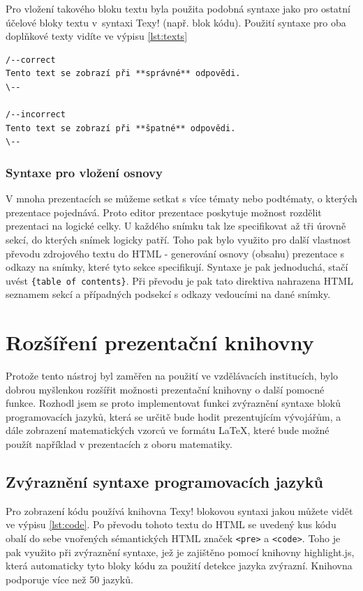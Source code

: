 \documentclass[11pt,twoside,a4paper]{book}
\begin{document}
Pro vložení takového bloku textu byla použita podobná syntaxe jako pro ostatní účelové bloky textu v~syntaxi Texy!
(např. blok kódu). Použití syntaxe pro oba doplňkové texty vidíte ve výpisu \ref{lst:texts}

\begin{lstlisting}[caption={Syntaxe doplňkových textů},label={lst:texts}]
/--correct
Tento text se zobrazí při **správné** odpovědi.
\--

/--incorrect
Tento text se zobrazí při **špatné** odpovědi.
\--
\end{lstlisting}

\subsubsection{Syntaxe pro vložení osnovy}
V mnoha prezentacích se můžeme setkat s více tématy nebo podtématy, o kterých prezentace pojednává. Proto editor prezentace poskytuje možnost rozdělit prezentaci na logické celky. U každého snímku tak lze specifikovat až tři úrovně sekcí, do kterých snímek logicky patří. Toho pak bylo využito pro další vlastnost převodu zdrojového textu do HTML - generování osnovy (obsahu) prezentace s odkazy na snímky, které tyto sekce specifikují. Syntaxe je pak jednoduchá, stačí uvést \verb|{table of contents}|. Při převodu je pak tato direktiva nahrazena HTML seznamem sekcí a případných podsekcí s odkazy vedoucími na dané snímky.


\section{Rozšíření prezentační knihovny}
Protože tento nástroj byl zaměřen na použití ve vzdělávacích institucích, bylo dobrou myšlenkou rozšířit možnosti prezentační knihovny o další pomocné funkce. Rozhodl jsem se proto implementovat funkci zvýraznění syntaxe bloků programovacích jazyků, která se určitě bude hodit prezentujícím vývojářům, a dále zobrazení matematických vzorců ve formátu \LaTeX, které bude možné použít například v prezentacích z oboru matematiky.

\subsection{Zvýraznění syntaxe programovacích jazyků}
Pro zobrazení kódu používá knihovna Texy! blokovou syntaxi jakou můžete vidět ve výpisu \ref{lst:code}. Po převodu tohoto textu do HTML se uvedený kus kódu obalí do sebe vnořených sémantických HTML značek \verb|<pre>| a \verb|<code>|. Toho je pak využito při zvýraznění syntaxe, jež je zajištěno pomocí knihovny highlight.js\cite{highlight}, která automaticky tyto bloky kódu za použití detekce jazyka zvýrazní. Knihovna podporuje více než 50 jazyků.
\end{document}
